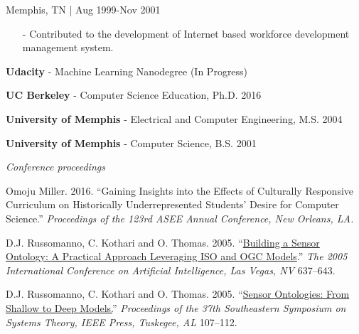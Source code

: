 \documentclass[11pt,article,oneside]{memoir}
\begin{document}
 \hfill Memphis, TN | Aug 1999-Nov 2001
\begin{itemize}[noitemsep,nolistsep]
\item[-]Contributed to the development of Internet based workforce development management system.
\end{itemize} 

\bigskip 



\ind \textbf{Udacity} - Machine Learning Nanodegree  \hfill (In Progress)

\ind \textbf{UC Berkeley} - Computer Science Education, Ph.D. \hfill 2016

\ind \textbf{University of Memphis} - Electrical and Computer Engineering, M.S. \hfill 2004

\ind \textbf{University of Memphis} - Computer Science, B.S. \hfill 2001

\bigskip 


\medskip

\noindent\emph{Conference proceedings \vspace{0.05in}}
 

\ind Omoju Miller. 2016. ``Gaining Insights into the Effects of Culturally Responsive Curriculum on Historically Underrepresented Students' Desire for Computer Science.'' \emph{Proceedings of the 123rd ASEE Annual Conference, New Orleans, LA.}

\ind D.J. Russomanno, C. Kothari and O. Thomas. 2005. ``\href{https://scholar.google.com/citations?view_op=view_citation&hl=en&user=E7z_wrwAAAAJ&sortby=pubdate&citation_for_view=E7z_wrwAAAAJ:u5HHmVD_uO8C}{Building a Sensor Ontology: A Practical Approach Leveraging ISO and OGC Models}.'' \emph{The 2005 International Conference on Artificial Intelligence, Las Vegas, NV} 637--643. 

\ind D.J. Russomanno, C. Kothari and O. Thomas. 2005. ``\href{http://scholar.google.com/citations?view_op=view_citation&hl=en&user=E7z_wrwAAAAJ&citation_for_view=E7z_wrwAAAAJ:u-x6o8ySG0sC}{Sensor Ontologies: From Shallow to Deep Models.}'' \emph{Proceedings of the 37th Southeastern Symposium on Systems Theory, IEEE Press, Tuskegee, AL} 107--112. 
\end{document}
